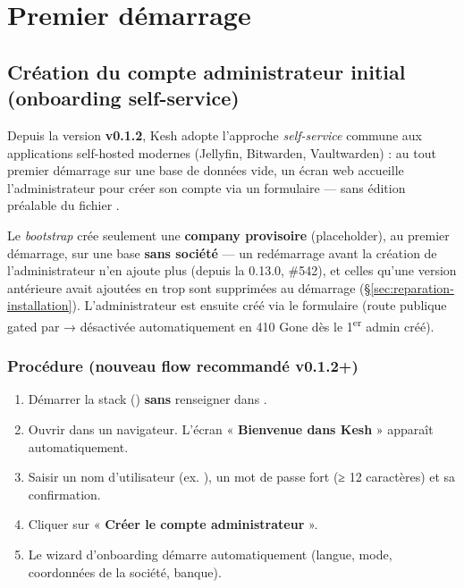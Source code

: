 \documentclass[a4paper,11pt,oneside]{article}
\begin{document}
\section{Premier démarrage}

\subsection{Création du compte administrateur initial (onboarding self-service)}

Depuis la version \textbf{v0.1.2}, Kesh adopte l'approche \emph{self-service} commune aux applications self-hosted modernes (Jellyfin, Bitwarden, Vaultwarden) : au tout premier démarrage sur une base de données vide, un écran web  accueille l'administrateur pour créer son compte via un formulaire — sans édition préalable du fichier .

Le \emph{bootstrap} crée seulement une \textbf{company provisoire} (placeholder), au premier démarrage, sur une base \textbf{sans société} --- un redémarrage avant la création de l'administrateur n'en ajoute plus (depuis la 0.13.0, \#542), et celles qu'une version antérieure avait ajoutées en trop sont supprimées au démarrage (\S\ref{sec:reparation-installation}). L'administrateur est ensuite créé via le formulaire  (route publique gated par  → désactivée automatiquement en 410 Gone dès le 1\textsuperscript{er} admin créé).

\subsubsection{Procédure (nouveau flow recommandé v0.1.2+)}

\begin{enumerate}
    \item Démarrer la stack () \textbf{sans} renseigner  dans .
    \item Ouvrir  dans un navigateur. L'écran « \textbf{Bienvenue dans Kesh} » apparaît automatiquement.
    \item Saisir un nom d'utilisateur (ex. ), un mot de passe fort (≥ 12 caractères) et sa confirmation.
    \item Cliquer sur « \textbf{Créer le compte administrateur} ».
    \item Le wizard d'onboarding démarre automatiquement (langue, mode, coordonnées de la société, banque).
\end{enumerate}
\end{document}
